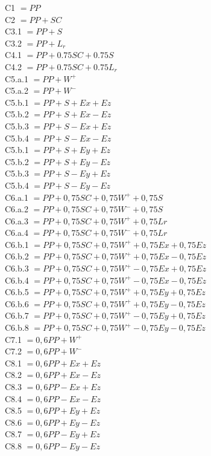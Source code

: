 \indent C1          $=PP$\\
\indent C2          $=PP+SC$\\
\indent C3.1        $=PP+S$\\
\indent C3.2        $=PP+L_{r}$\\
\indent C4.1        $=PP+0.75SC+0.75S$\\
\indent C4.2        $=PP+0.75SC+0.75L_{r}$\\
\indent C5.a.1      $=PP+W^{+}$\\
\indent C5.a.2      $=PP+W^{-}$\\
\indent C5.b.1      $=PP+S+Ex+Ez$\\
\indent C5.b.2      $=PP+S+Ex-Ez$\\
\indent C5.b.3      $=PP+S-Ex+Ez$\\
\indent C5.b.4      $=PP+S-Ex-Ez$\\
\indent C5.b.1      $=PP+S+Ey+Ez$\\
\indent C5.b.2      $=PP+S+Ey-Ez$\\
\indent C5.b.3      $=PP+S-Ey+Ez$\\
\indent C5.b.4      $=PP+S-Ey-Ez$\\
\indent C6.a.1      $=PP+0,75SC+0,75W^{+}+0,75S$\\
\indent C6.a.2      $=PP+0,75SC+0,75W^{-}+0,75S$\\
\indent C6.a.3      $=PP+0,75SC+0,75W^{+}+0,75Lr$\\
\indent C6.a.4      $=PP+0,75SC+0,75W^{-}+0,75Lr$\\
\indent C6.b.1      $=PP+0,75SC+0,75W^{+}+0,75Ex+0,75Ez$\\
\indent C6.b.2      $=PP+0,75SC+0,75W^{+}+0,75Ex-0,75Ez$\\
\indent C6.b.3      $=PP+0,75SC+0,75W^{+}-0,75Ex+0,75Ez$\\
\indent C6.b.4      $=PP+0,75SC+0,75W^{+}-0,75Ex-0,75Ez$\\
\indent C6.b.5      $=PP+0,75SC+0,75W^{+}+0,75Ey+0,75Ez$\\
\indent C6.b.6      $=PP+0,75SC+0,75W^{+}+0,75Ey-0,75Ez$\\
\indent C6.b.7      $=PP+0,75SC+0,75W^{+}-0,75Ey+0,75Ez$\\
\indent C6.b.8      $=PP+0,75SC+0,75W^{+}-0,75Ey-0,75Ez$\\
\indent C7.1        $=0,6PP+W^{+}$\\
\indent C7.2        $=0,6PP+W^{-}$\\
\indent C8.1        $=0,6PP+Ex+Ez$\\
\indent C8.2        $=0,6PP+Ex-Ez$\\
\indent C8.3        $=0,6PP-Ex+Ez$\\
\indent C8.4        $=0,6PP-Ex-Ez$\\
\indent C8.5        $=0,6PP+Ey+Ez$\\
\indent C8.6        $=0,6PP+Ey-Ez$\\
\indent C8.7        $=0,6PP-Ey+Ez$\\
\indent C8.8        $=0,6PP-Ey-Ez$\\

